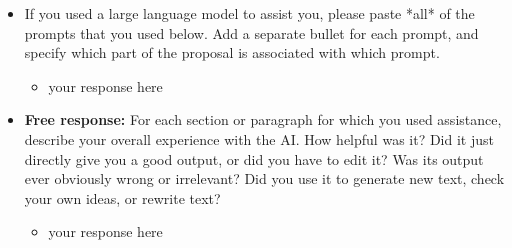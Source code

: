 \documentclass[11pt,a4paper]{article}
\begin{document}
\begin{itemize}
    \item  If you used a large language model to assist you, please paste *all* of the prompts that you used below. Add a separate bullet for each prompt, and specify which part of the proposal is associated with which prompt.
    \begin{itemize}
        \item your response here
    \end{itemize}
    \item \textbf{Free response:} For each section or paragraph for which you used assistance, describe your overall experience with the AI. How helpful was it? Did it just directly give you a good output, or did you have to edit it? Was its output ever obviously wrong or irrelevant? Did you use it to generate new text, check your own ideas, or rewrite text?
    \begin{itemize}
        \item your response here
    \end{itemize}
\end{itemize}



\footnotesize

\end{document}

